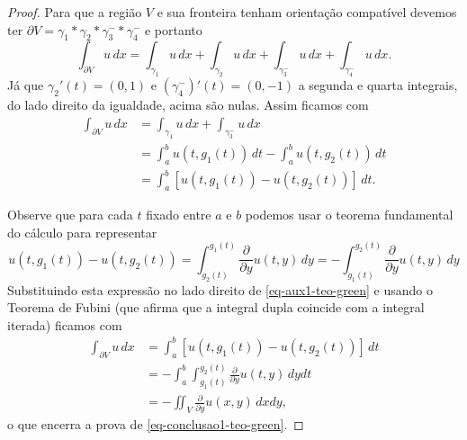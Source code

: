 \begin{proof}
Para que a região $V$ e sua fronteira tenham orientação compatível devemos ter 
$\partial V  = \gamma_1*\gamma_2*\gamma^{-}_3*\gamma^{-}_4$ e portanto 
\[
\int_{\partial V} u \, dx
=
\int_{\gamma_1} u\, dx
+
\int_{\gamma_2} u\, dx
+
\int_{\gamma^{-}_3} u\, dx
+
\int_{\gamma^{-}_4} u\, dx.
\]
Já que $\gamma_2'(t)=(0,1)$ e $(\gamma_4^{-})'(t)=(0,-1)$ a segunda e quarta integrais,
do lado direito da igualdade, acima são nulas. Assim ficamos com 
\begin{align}\label{eq-aux1-teo-green}
\int_{\partial V} u \, dx
&=
\int_{\gamma_1} u\, dx
+
\int_{\gamma^{-}_3} u\, dx
\nonumber
\\
&=
\int_{a}^{b} u(t,g_1(t))\, dt -\int_{a}^{b} u(t,g_2(t))\, dt
\nonumber
\\
&=
\int_{a}^{b} [u(t,g_1(t))-u(t,g_2(t))]\, dt.
\end{align}

Observe que para cada $t$ fixado entre $a$ e $b$ podemos usar o teorema fundamental do cálculo
para representar 
\[
u(t,g_1(t))-u(t,g_2(t)) 
=
\int_{g_2(t)}^{g_1(t)} \frac{\partial}{\partial y}u(t,y)\, dy
=
-\int_{g_1(t)}^{g_2(t)} \frac{\partial}{\partial y}u(t,y)\, dy
\]
Substituindo esta expressão no lado direito de \eqref{eq-aux1-teo-green}
e usando o Teorema de Fubini (que afirma que a integral dupla coincide com a integral iterada)
ficamos com 
\begin{align*}
\int_{\partial V} u \, dx
&=
\int_{a}^{b} [u(t,g_1(t))-u(t,g_2(t))]\, dt
\\[0.3cm]
&=
-\int_{a}^{b} \int_{g_1(t)}^{g_2(t)} \frac{\partial}{\partial y}u(t,y)\, dy dt
\\[0.3cm]
&=
-\iint_{V} \frac{\partial }{\partial y}u(x,y) \, dxdy,
\end{align*}
o que encerra a prova de \eqref{eq-conclusao1-teo-green}.


\end{proof}
